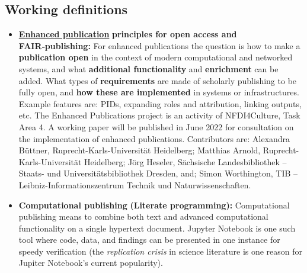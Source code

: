 \documentclass{article}
\begin{document}
\subsection{Working definitions}\label{H6504202}


\begin{itemize}
\item \textbf{\href{https://docs.google.com/presentation/d/e/2PACX-1vQ_xJVZdXpznOTufuOqTp8VgrkUGPlWnF7SBGYf0lZNWF_PpERuvLInKEmGuT2IBHz6kxkZy4cpVq2U/pub?start=false&loop=false&delayms=3000}{Enhanced publication}}\textbf{ principles for open access and FAIR‑publishing}\textbf{:} For enhanced publications the question is how to make a \textbf{publication open} in the context of modern computational and networked systems, and what \textbf{additional functionality} and \textbf{enrichment} can be added. What types of \textbf{requirements }are made of scholarly publishing to be fully open, and \textbf{how these are implemented }in systems or infrastructures. Example features are: PIDs, expanding roles and attribution, linking outputs, etc. The Enhanced Publications project is an activity of NFDI4Culture, Task Area 4. A working paper will be published in June 2022 for consultation on the implementation of enhanced publications. Contributors are: Alexandra Büttner, Ruprecht-Karls-Universität Heidelberg; Matthias Arnold, Ruprecht-Karls-Universität Heidelberg; Jörg Heseler, Sächsische Landesbibliothek – Staats- und Universitätsbibliothek Dresden, and; Simon Worthington, TIB – Leibniz-Informationszentrum Technik und Naturwissenschaften.


\item \textbf{Computational publishing}\textbf{ (Literate programming): }\autocite{KnuthDonald1992} Computational publishing means to combine both text and advanced computational functionality on a single hypertext document. Jupyter Notebook is one such tool where code, data, and findings can be presented in one instance for speedy verification (the \emph{replication crisis} in science literature is one reason for Jupiter Notebook's current popularity).



\end{itemize}
\end{document}
